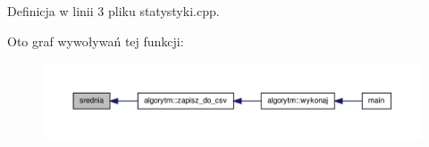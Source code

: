 \-Definicja w linii 3 pliku statystyki.\-cpp.



\-Oto graf wywoływań tej funkcji\-:\nopagebreak
\begin{figure}[H]
\begin{center}
\leavevmode
\includegraphics[width=350pt]{statystyki_8hh_a978b972ebd4a834c47800d668ba8ecf2_icgraph}
\end{center}
\end{figure}


